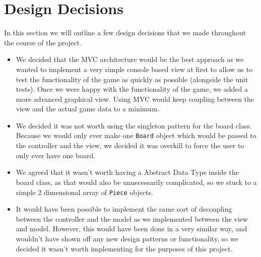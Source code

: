 \documentclass[11pt,a4paper,oneside]{article}
\begin{document}
\section*{Design Decisions}
In this section we will outline a few design decisions that we made throughout the course of the project.

\begin{itemize}
\item We decided that the MVC architecture would be the best approach as we wanted to implement a very simple console based view at first to allow us to test the functionality of the game as quickly as possible (alongside the unit tests). Once we were happy with the functionality of the game, we added a more advanced graphical view. Using MVC would keep coupling between the view and the actual game data to a minimum.

\item We decided it was not worth using the singleton pattern for the board class. Because we would only ever make one \texttt{Board} object which would be passed to the controller and the view, we decided it was overkill to force the user to only ever have one board.

\item We agreed that it wasn't worth having a Abstract Data Type inside the board class, as that would also be unnecessarily complicated, so we stuck to a simple 2 dimensional array of \texttt{Piece} objects.

\item It would have been possible to implement the same sort of decoupling between the controller and the model as we implemented between the view and model. However, this would have been done in a very similar way, and wouldn't have shown off any new design patterns or functionality, so we decided it wasn't worth implementing for the purposes of this project.
\end{itemize}
\end{document}
